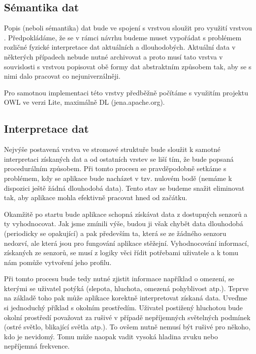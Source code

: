 \documentclass[thesis=M,czech]{FITthesis}[2012/06/26]
\begin{document}
\subsection{Sémantika dat}
Popis (neboli sémantika) dat bude ve spojení s vrstvou  sloužit pro využití vrstvou . Předpokládáme, že se v rámci návrhu budeme muset vypořádat s problémem rozličné fyzické interpretace dat aktuálních a dlouhodobých. Aktuální data v některých případech nebude nutné archivovat a proto musí tato vrstva v souvislosti s vrstvou  popisovat obě formy dat abstraktním způsobem tak, aby se s nimi dalo pracovat co nejuniverzálněji.

Pro samotnou implementaci této vrstvy předběžně počítáme s využitím projektu OWL ve verzi Lite, maximálně DL (jena.apache.org).

\subsection{Interpretace dat}
Nejvýše postavená vrstva ve stromové struktuře bude sloužit k samotné interpretaci získaných dat a od ostatních vrstev se liší tím, že bude popsaná procedurálním způsobem. Při tomto procesu se pravděpodobně setkáme s problémem, kdy se aplikace bude nacházet v tzv. nulovém bodě (nemáme k dispozici ještě žádná dlouhodobá data). Tento stav se budeme snažit eliminovat tak, aby aplikace mohla efektivně pracovat hned od začátku.

Okamžitě po startu bude aplikace schopná získávat data z dostupných senzorů a ty vyhodnocovat. Jak jsme zmínili výše, budou ji však chybět data dlouhodobá (periodicky se opakující) a pak především ta, která se ze žádného senzoru nedozví, ale která jsou pro fungování aplikace stěžejní. Vyhodnocování informací, získaných ze senzorů, se musí z logiky věci řídit potřebami uživatele a k tomu nám pomůže vytvoření jeho profilu.

Při tomto procesu bude tedy nutné zjistit informace například o omezení, se kterými se uživatel potýká (slepota, hluchota, omezená pohyblivost atp.). Teprve na základě toho pak může aplikace korektně interpretovat získaná data. Uveďme si jednoduchý příklad s okolním prostředím. Uživatel postižený hluchotou bude okolní prostředí považovat za rušivé v případě nepříjemných světelných podmínek (ostré světlo, blikající světla atp.). To ovšem nutně nemusí být rušivé pro někoho, kdo je nevidomý. Tomu může naopak vadit vysoká hladina zvuku nebo nepříjemná frekvence.
\end{document}
